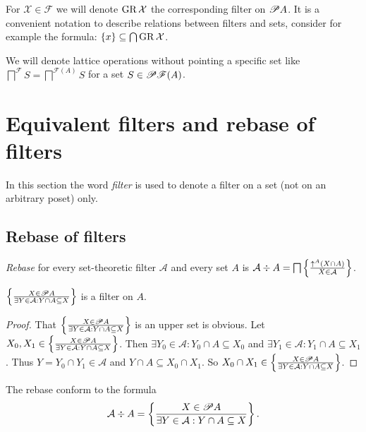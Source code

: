 For $\mathcal{X}\in\mathscr{F}$ we will denote $\operatorname{GR}\mathcal{X}$
the corresponding filter on $\mathscr{P} A$. It is a convenient notation
to describe relations between filters and sets, consider for example
the formula: $\{x\}\subseteq\bigcap\operatorname{GR}\mathcal{X}$.

We will denote lattice operations without pointing a specific set
like $\bigsqcap^{\mathscr{F}}S=\bigsqcap^{\mathscr{F}(A)}S$ for a
set $S\in\mathscr{P}\mathscr{F}(A)$.

\section{Equivalent filters and rebase of filters}

In this section the word \emph{filter} is used to denote a filter
on a set (not on an arbitrary poset) only.

\subsection{Rebase of filters}

\begin{defn}
\emph{Rebase} for every set-theoretic filter $\mathcal{A}$
and every set $A$ is
  $\mathcal{A} \div A = \bigsqcap \left\{ \frac{ \uparrow^A  (X \cap A) }{ X \in \mathcal{A} }\right\}$.
\end{defn}

\begin{lem}
$\left\{ \frac{X\in\mathscr{P} A}{\exists Y\in\mathcal{A}:Y\cap A\subseteq X}\right\}$ is a filter on $A$.
\end{lem}

\begin{proof}
That $\left\{ \frac{X\in\mathscr{P} A}{\exists Y\in\mathcal{A}:Y\cap A\subseteq X}\right\}$ is an upper set is obvious. Let $X_0,X_1\in\left\{ \frac{X\in\mathscr{P} A}{\exists Y\in\mathcal{A}:Y\cap A\subseteq X}\right\}$.
Then $\exists Y_0\in\mathcal{A}:Y_0\cap A\subseteq X_0$ and $\exists Y_1\in\mathcal{A}:Y_1\cap A\subseteq X_1$.
Thus $Y=Y_0\cap Y_1\in\mathcal{A}$ and $Y\cap A\subseteq X_0\cap X_1$. So $X_0\cap X_1\in\left\{ \frac{X\in\mathscr{P} A}{\exists Y\in\mathcal{A}:Y\cap A\subseteq X}\right\}$.
\end{proof}

\begin{prop}
The rebase conform to the formula
\[
\mathcal{A}\div A=\left\{ \frac{X\in\mathscr{P} A}{\exists Y\in\mathcal{A}:Y\cap A\subseteq X}\right\}.
\]
\end{prop}

